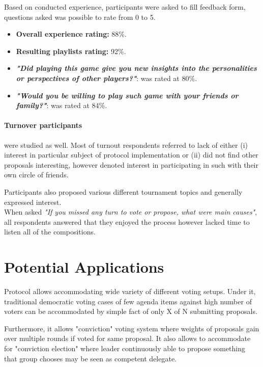\documentclass{article}
\begin{document}
\begin{CJK}{UTF8}{gbsn}
\begin{multicols}{2}
        Based on conducted experience, participants were asked to fill feedback form, questions asked was possible to rate from 0 to 5.
        \begin{itemize}
            \setlength\itemsep{2px}
            \item \textbf{Overall experience rating:} 88\%.
            \item \textbf{Resulting playlists rating:} 92\%.
            \item \textbf{\textit{"Did playing this game give you new insights into the personalities or perspectives of other players?"}}: was rated at 80\%.
            \item \textbf{\textit{"Would you be willing to play such game with your friends or family?"}}: was rated at 84\%.
        \end{itemize}

        \paragraph{Turnover participants} were studied as well. Most of turnout respondents referred to lack of either (i) interest in particular subject of protocol implementation or (ii) did not find other proposals interesting, however denoted interest in participating in such with their own circle of friends.

        Participants also proposed various different tournament topics and generally expressed interest. \\When asked \textit{"If you missed any turn to vote or propose, what were main causes"}, all respondents answered that they enjoyed the process however lacked time to listen all of the compositions.



        \section{Potential Applications}
        Protocol allows accommodating wide variety of different voting setups. Under it, traditional democratic voting cases of  few agenda items against high number of voters can be accommodated by simple fact of only X of N submitting proposals.

        Furthermore, it allows "conviction" voting system where weights of proposals gain over multiple rounds if voted for same proposal. It also allows to accommodate for "conviction election" where leader continuously able to propose something that group chooses may be seen as competent delegate.


\end{multicols}
\end{CJK}
\end{document}
